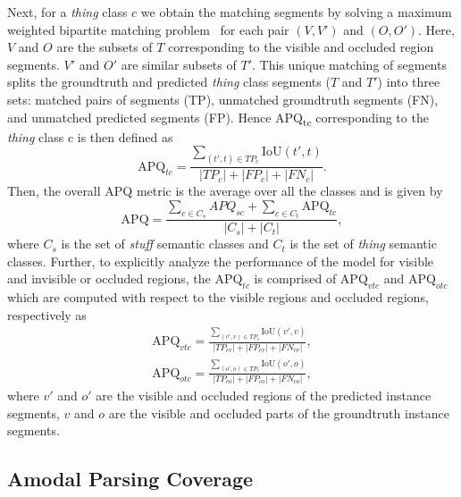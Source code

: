 \documentclass[10pt,twocolumn,letterpaper]{article}
\begin{document}
Next, for a \textit{thing} class $c$ we obtain the matching segments by solving a maximum weighted bipartite matching problem~\cite{west2001introduction} for each pair  $(V, V')$ and $(O, O')$. Here,  $V$ and $O$ are the subsets of $T$ corresponding to the visible and occluded region segments. $V'$ and $O'$ are similar subsets of $T'$. This unique matching of segments splits the groundtruth and predicted \textit{thing} class segments ($T$ and $T'$) into three sets: matched pairs of segments (TP), unmatched groundtruth segments (FN), and unmatched predicted segments (FP). Hence APQ\textsubscript{tc} corresponding to the \textit{thing} class c is then defined as
\begin{equation}
\text{APQ}_{tc} = \frac{\sum_{(t',t)\in TP_c}\text{IoU}(t',t)}{|TP_c|+|FP_c|+|FN_c|}.
\end{equation}
Then, the overall APQ metric is the average over all the classes and is given by
\begin{equation}
\text{APQ} = \frac{\sum_{c\in C_s}APQ_{sc} + \sum_{c\in C_t}\text{APQ}_{tc}}{|C_s|+ |C_t|},
\end{equation}
where $C_s$ is the set of \textit{stuff} semantic classes and $C_t$ is the set of \textit{thing} semantic classes. Further, to explicitly analyze the performance of the model for visible and invisible or occluded regions, the $\text{APQ}_{tc}$ is comprised of $\text{APQ}_{vtc}$ and $\text{APQ}_{otc}$ which are computed with respect to the visible regions and occluded regions, respectively as
\begin{align}
\text{APQ}_{vtc} = \frac{\sum_{(v',v)\in TP_c}\text{IoU}(v',v)}{| TP_{cv}|+|FP_{cv}|+|FN_{cv}|},\\
\text{APQ}_{otc} = \frac{\sum_{(o',o)\in TP_c}\text{IoU}(o',o)}{| TP_{co}|+|FP_{co}|+|FN_{co}|},
\end{align}
where $v'$ and $o'$ are the visible and occluded regions of the predicted instance segments, $v$ and $o$ are the visible and occluded parts of the groundtruth instance segments. 



\subsection{Amodal Parsing Coverage}
\end{document}
